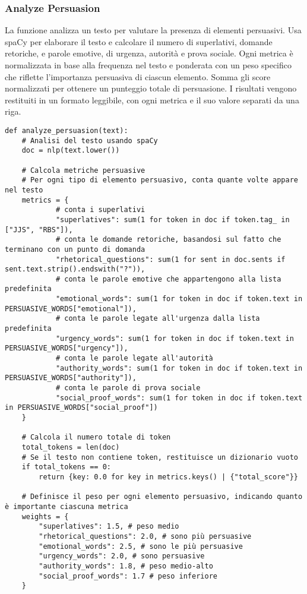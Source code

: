 \documentclass[12pt]{article}
\begin{document}
		\subsubsection{Analyze Persuasion}
La funzione analizza un testo per valutare la presenza di elementi persuasivi. Usa spaCy per elaborare il testo e calcolare il numero di superlativi, domande retoriche, e parole emotive, di urgenza, autorità e prova sociale. Ogni metrica è normalizzata in base alla frequenza nel testo e ponderata con un peso specifico che riflette l'importanza persuasiva di ciascun elemento. Somma gli score normalizzati per ottenere un punteggio totale di persuasione. I risultati vengono restituiti in un formato leggibile, con ogni metrica e il suo valore separati da una riga.	
	\begin{lstlisting}
def analyze_persuasion(text):
	# Analisi del testo usando spaCy
	doc = nlp(text.lower())
	
	# Calcola metriche persuasive
	# Per ogni tipo di elemento persuasivo, conta quante volte appare nel testo 
	metrics = {
			# conta i superlativi
			"superlatives": sum(1 for token in doc if token.tag_ in ["JJS", "RBS"]),
			# conta le domande retoriche, basandosi sul fatto che terminano con un punto di domanda
			"rhetorical_questions": sum(1 for sent in doc.sents if sent.text.strip().endswith("?")),
			# conta le parole emotive che appartengono alla lista predefinita
			"emotional_words": sum(1 for token in doc if token.text in PERSUASIVE_WORDS["emotional"]),
			# conta le parole legate all'urgenza dalla lista predefinita
			"urgency_words": sum(1 for token in doc if token.text in PERSUASIVE_WORDS["urgency"]),
			# conta le parole legate all'autorità
			"authority_words": sum(1 for token in doc if token.text in PERSUASIVE_WORDS["authority"]),
			# conta le parole di prova sociale
			"social_proof_words": sum(1 for token in doc if token.text in PERSUASIVE_WORDS["social_proof"])
	}

	# Calcola il numero totale di token
	total_tokens = len(doc)
	# Se il testo non contiene token, restituisce un dizionario vuoto
	if total_tokens == 0:
		return {key: 0.0 for key in metrics.keys() | {"total_score"}}

	# Definisce il peso per ogni elemento persuasivo, indicando quanto è importante ciascuna metrica
	weights = {
		"superlatives": 1.5, # peso medio
		"rhetorical_questions": 2.0, # sono più persuasive
		"emotional_words": 2.5, # sono le più persuasive
		"urgency_words": 2.0, # sono persuasive 
		"authority_words": 1.8, # peso medio-alto
		"social_proof_words": 1.7 # peso inferiore
	}


\end{lstlisting}
\end{document}
